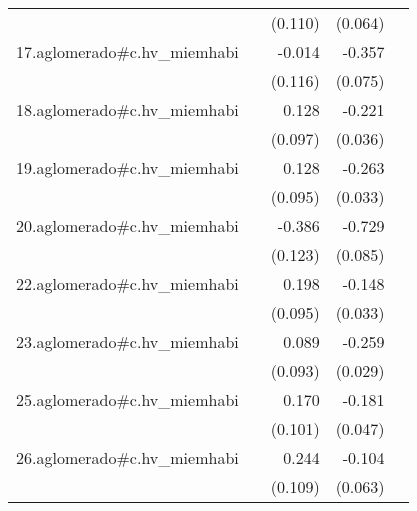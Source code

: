 {\begin{longtable}{l*{4}{D{.}{.}{-1}}}
            &                     &     (0.110)         &     (0.064)         &                     \\
\addlinespace
17.aglomerado#c.hv\_miemhabi&                     &      -0.014         &      -0.357\sym{***}&                     \\
            &                     &     (0.116)         &     (0.075)         &                     \\
\addlinespace
18.aglomerado#c.hv\_miemhabi&                     &       0.128         &      -0.221\sym{***}&                     \\
            &                     &     (0.097)         &     (0.036)         &                     \\
\addlinespace
19.aglomerado#c.hv\_miemhabi&                     &       0.128         &      -0.263\sym{***}&                     \\
            &                     &     (0.095)         &     (0.033)         &                     \\
\addlinespace
20.aglomerado#c.hv\_miemhabi&                     &      -0.386\sym{**} &      -0.729\sym{***}&                     \\
            &                     &     (0.123)         &     (0.085)         &                     \\
\addlinespace
22.aglomerado#c.hv\_miemhabi&                     &       0.198\sym{*}  &      -0.148\sym{***}&                     \\
            &                     &     (0.095)         &     (0.033)         &                     \\
\addlinespace
23.aglomerado#c.hv\_miemhabi&                     &       0.089         &      -0.259\sym{***}&                     \\
            &                     &     (0.093)         &     (0.029)         &                     \\
\addlinespace
25.aglomerado#c.hv\_miemhabi&                     &       0.170         &      -0.181\sym{***}&                     \\
            &                     &     (0.101)         &     (0.047)         &                     \\
\addlinespace
26.aglomerado#c.hv\_miemhabi&                     &       0.244\sym{*}  &      -0.104         &                     \\
            &                     &     (0.109)         &     (0.063)         &                     \\

\end{longtable}}
